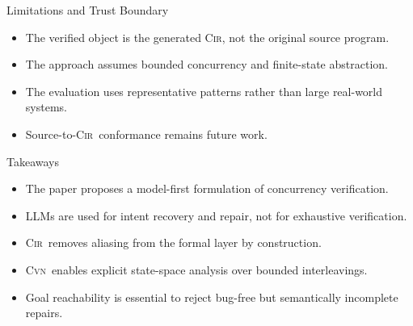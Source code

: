 \documentclass[aspectratio=169]{beamer}
\newcommand{\Cir}{\textsc{Cir}}
\newcommand{\Cvn}{\textsc{Cvn}}
\begin{document}
\begin{frame}{Limitations and Trust Boundary}
  \begin{itemize}
    \item The verified object is the generated \Cir, not the original source program.
    \item The approach assumes bounded concurrency and finite-state abstraction.
    \item The evaluation uses representative patterns rather than large real-world systems.
    \item Source-to-\Cir\ conformance remains future work.
  \end{itemize}
\end{frame}

\begin{frame}{Takeaways}
  \begin{itemize}
    \item The paper proposes a model-first formulation of concurrency verification.
    \item LLMs are used for intent recovery and repair, not for exhaustive verification.
    \item \Cir\ removes aliasing from the formal layer by construction.
    \item \Cvn\ enables explicit state-space analysis over bounded interleavings.
    \item Goal reachability is essential to reject bug-free but semantically incomplete repairs.
  \end{itemize}
\end{frame}
\end{document}
